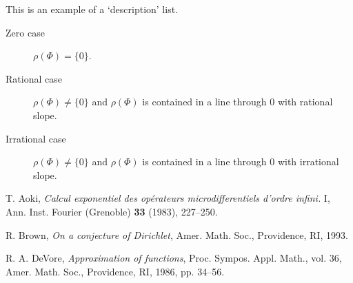 This is an example of a `description' list.

\begin{description}
\item[Zero case] $\rho(\Phi) = \{0\}$.

\item[Rational case] $\rho(\Phi) \ne \{0\}$ and $\rho(\Phi)$ is
contained in a line through $0$ with rational slope.

\item[Irrational case] $\rho(\Phi) \ne \{0\}$ and $\rho(\Phi)$ is
contained in a line through $0$ with irrational slope.
\end{description}


\begin{thebibliography}{10}

 T. Aoki, \textit{Calcul exponentiel des op\'erateurs
microdifferentiels d'ordre infini.} I, Ann. Inst. Fourier (Grenoble)
\textbf{33} (1983), 227--250.

 R. Brown, \textit{On a conjecture of Dirichlet},
Amer. Math. Soc., Providence, RI, 1993.

 R. A. DeVore, \textit{Approximation of functions},
Proc. Sympos. Appl. Math., vol. 36,
Amer. Math. Soc., Providence, RI, 1986, pp. 34--56.

\end{thebibliography}